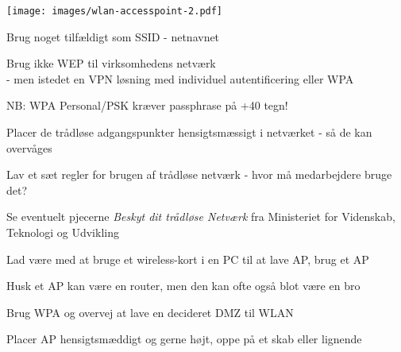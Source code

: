 \documentclass[Screen16to9,17pt]{foils}
\begin{document}
\begin{minipage}{10cm}
\texttt{[image: images/wlan-accesspoint-2.pdf]}
\end{minipage}
\begin{minipage}{\linewidth-10cm}
\begin{list2}
\item Brug noget tilfældigt som SSID - netnavnet
\item Brug ikke WEP til virksomhedens netværk\\
- men istedet en VPN løsning med individuel
  autentificering eller WPA
\item NB: WPA Personal/PSK kræver passphrase på +40 tegn!
\item Placer de trådløse adgangspunkter hensigtsmæssigt i netværket -
  så de kan overvåges
\item Lav et sæt regler for brugen af trådløse netværk - hvor må
  medarbejdere bruge det?
\item Se eventuelt pjecerne \emph{Beskyt dit trådløse Netværk} fra
Ministeriet for Videnskab, Teknologi og Udvikling \\
\end{list2}
\end{minipage}



\begin{list1}
\item Lad være med at bruge et wireless-kort i en PC til at lave AP, brug et AP
\item Husk et AP kan være en router, men den kan ofte også blot være en bro
\item Brug WPA og overvej at lave en decideret DMZ til WLAN
\item Placer AP hensigtsmæddigt og gerne højt, oppe på et skab eller lignende
\end{list1}



\slidenext
\end{document}
